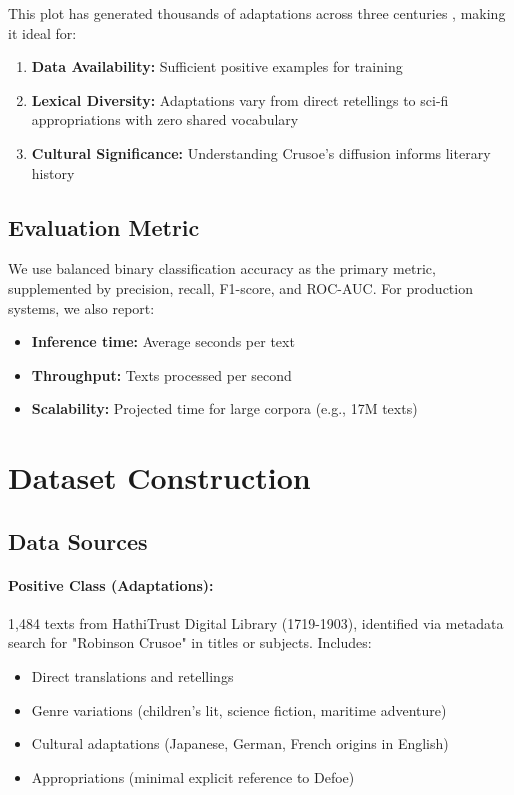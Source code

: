 \documentclass[11pt,a4paper]{article}
\begin{document}
This plot has generated thousands of adaptations across three centuries \cite{Green1990RobinsonCrusoeStory}, making it ideal for:

\begin{enumerate}
    \item \textbf{Data Availability:} Sufficient positive examples for training
    \item \textbf{Lexical Diversity:} Adaptations vary from direct retellings to sci-fi appropriations with zero shared vocabulary
    \item \textbf{Cultural Significance:} Understanding Crusoe's diffusion informs literary history \cite{Watt2001RiseNovel}
\end{enumerate}

\subsection{Evaluation Metric}

We use balanced binary classification accuracy as the primary metric, supplemented by precision, recall, F1-score, and ROC-AUC. For production systems, we also report:

\begin{itemize}
    \item \textbf{Inference time:} Average seconds per text
    \item \textbf{Throughput:} Texts processed per second
    \item \textbf{Scalability:} Projected time for large corpora (e.g., 17M texts)
\end{itemize}

\section{Dataset Construction}

\subsection{Data Sources}

\paragraph{Positive Class (Adaptations):} 1,484 texts from HathiTrust Digital Library \cite{Christenson2011HathiTrust} (1719-1903), identified via metadata search for "Robinson Crusoe" in titles or subjects. Includes:

\begin{itemize}
    \item Direct translations and retellings
    \item Genre variations (children's lit, science fiction, maritime adventure)
    \item Cultural adaptations (Japanese, German, French origins in English)
    \item Appropriations (minimal explicit reference to Defoe)
\end{itemize}
\end{document}
